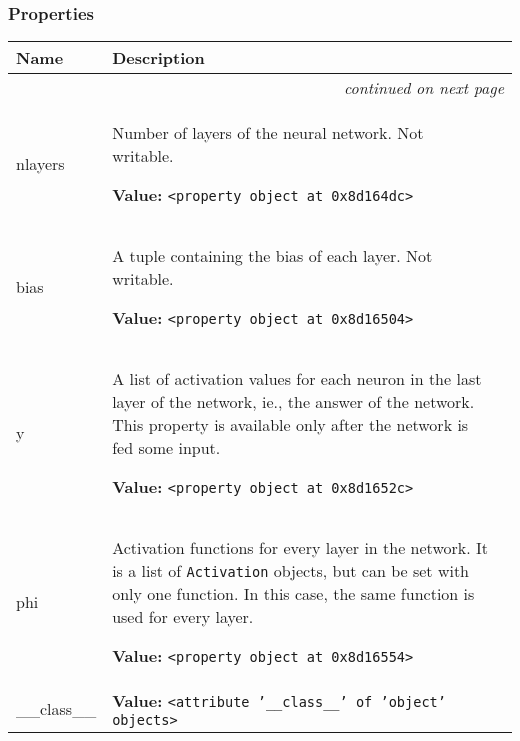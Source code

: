 
  \subsubsection{Properties}

\begin{longtable}{|p{}|p{}|l}
\cline{1-2}
\cline{1-2} \centering \textbf{Name} & \centering \textbf{Description}& \\
\cline{1-2}
\endhead\cline{1-2}\multicolumn{3}{r}{\small\textit{continued on next page}}\\\endfoot\cline{1-2}
\endlastfoot\raggedright n\-l\-a\-y\-e\-r\-s\- & \raggedright Number of layers of the neural network. Not writable.

\textbf{Value:} 
{\tt {\textless}property object at 0x8d164dc{\textgreater}}&\\
\cline{1-2}
\raggedright b\-i\-a\-s\- & \raggedright A tuple containing the bias of each layer. Not writable.

\textbf{Value:} 
{\tt {\textless}property object at 0x8d16504{\textgreater}}&\\
\cline{1-2}
\raggedright y\- & \raggedright A list of activation values for each neuron in the last layer of the
network, ie., the answer of the network. This property is available only
after the network is fed some input.

\textbf{Value:} 
{\tt {\textless}property object at 0x8d1652c{\textgreater}}&\\
\cline{1-2}
\raggedright p\-h\-i\- & \raggedright Activation functions for every layer in the network. It is a list of
\texttt{Activation} objects, but can be set with only one function. In this case,
the same function is used for every layer.

\textbf{Value:} 
{\tt {\textless}property object at 0x8d16554{\textgreater}}&\\
\cline{1-2}
\raggedright \_\-\_\-c\-l\-a\-s\-s\-\_\-\_\- & \raggedright \textbf{Value:} 
{\tt {\textless}attribute '\_\_class\_\_' of 'object' objects{\textgreater}}&\\
\cline{1-2}
\end{longtable}


